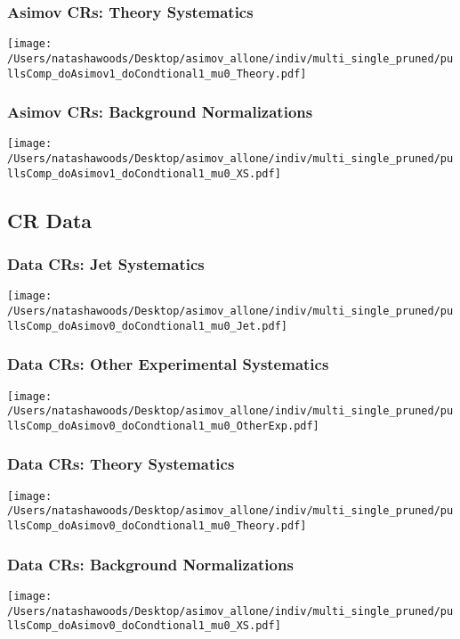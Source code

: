 \documentclass{beamer}
\begin{document}
\begin{frame}
\frametitle{Asimov CRs: Theory Systematics}

       \texttt{[image: /Users/natashawoods/Desktop/asimov\_allone/indiv/multi\_single\_pruned/pullsComp\_doAsimov1\_doCondtional1\_mu0\_Theory.pdf]}
\end{frame}

\begin{frame}
\frametitle{Asimov CRs: Background Normalizations}
       \texttt{[image: /Users/natashawoods/Desktop/asimov\_allone/indiv/multi\_single\_pruned/pullsComp\_doAsimov1\_doCondtional1\_mu0\_XS.pdf]}
\end{frame}

\subsection{CR Data}
\begin{frame}
\frametitle{Data CRs: Jet Systematics}
       \texttt{[image: /Users/natashawoods/Desktop/asimov\_allone/indiv/multi\_single\_pruned/pullsComp\_doAsimov0\_doCondtional1\_mu0\_Jet.pdf]}
\end{frame}

\begin{frame}
\frametitle{Data CRs: Other Experimental Systematics}
       \texttt{[image: /Users/natashawoods/Desktop/asimov\_allone/indiv/multi\_single\_pruned/pullsComp\_doAsimov0\_doCondtional1\_mu0\_OtherExp.pdf]}
\end{frame}


\begin{frame}
\frametitle{Data CRs: Theory Systematics}
       \texttt{[image: /Users/natashawoods/Desktop/asimov\_allone/indiv/multi\_single\_pruned/pullsComp\_doAsimov0\_doCondtional1\_mu0\_Theory.pdf]}
\end{frame}

\begin{frame}
\frametitle{Data CRs: Background Normalizations}
       \texttt{[image: /Users/natashawoods/Desktop/asimov\_allone/indiv/multi\_single\_pruned/pullsComp\_doAsimov0\_doCondtional1\_mu0\_XS.pdf]}
\end{frame}
\end{document}
